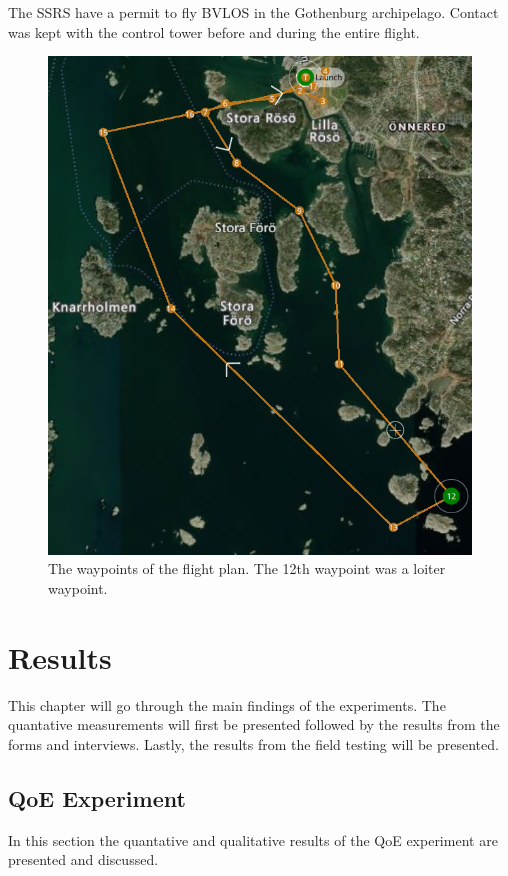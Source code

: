 \documentclass[nofilelist]{cslthse-msc}
\begin{document}
The SSRS have a permit to fly BVLOS in the Gothenburg archipelago. Contact was kept with the control tower before and during the entire flight.

\begin{figure}[!hbt]
   \centering
   \includegraphics[scale=0.4]{images/flight-plan.png} 
   \caption{The waypoints of the flight plan. The 12th waypoint was a loiter waypoint.}
   \label{fig:flight-plan}
\end{figure}

\chapter{Results}
This chapter will go through the main findings of the experiments. The quantative measurements will first be presented followed by the results from the forms and interviews. Lastly, the results from the field testing will be presented.

\section{QoE Experiment}
In this section the quantative and qualitative results of the QoE experiment are presented and discussed.  
\end{document}
